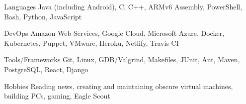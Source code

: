 

\begin{cvskills}


  \cvskill
    {Languages} %
    {Java (including Android), C, C++, ARMv6 Assembly, PowerShell, Bash, Python, JavaScript} %

  \cvskill
    {DevOps} %
    {Amazon Web Services, Google Cloud, Microsoft Azure, Docker, Kubernetes, Puppet, VMware, Heroku, Netlify, Travis CI} %
    
  \cvskill
    {Tools/Frameworks} %
    {Git, Linux, GDB/Valgrind, Makefiles, JUnit, Ant, Maven, PostgreSQL, React, Django} %

  \cvskill
  {Hobbies} %
  {Reading news, creating and maintaining obscure virtual machines, building PCs, gaming, Eagle Scout} %

\end{cvskills}
